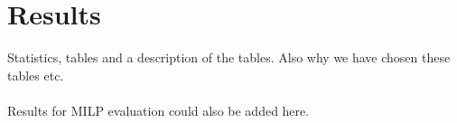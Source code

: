 \chapter{Results}
Statistics, tables and a description of the tables. Also why we have chosen these tables etc.\\\\
Results for MILP evaluation could also be added here.
